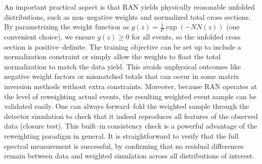         An important practical aspect is that RAN yields physically reasonable unfolded distributions, such as non--negative weights and normalized total cross sections.
        By parametrizing the weight function as $g({z}) = \frac1P\exp(-NN({z}))$ (one convenient choice), we ensure $g({z})\ge 0$ for all events, so the unfolded cross section is positive--definite.
        The training objective can be set up to include a normalization constraint or simply allow the weights to float the total normalization to match the data yield.
        This avoids unphysical outcomes like negative weight factors or mismatched totals that can occur in some matrix inversion methods without extra constraints.
        Moreover, because RAN operates at the level of reweighting actual events, the resulting weighted event sample can be validated easily.
        One can always forward--fold the weighted sample through the detector simulation to check that it indeed reproduces all features of the observed data (closure test).
        This built--in consistency check is a powerful advantage of the reweighting paradigm in general.
        It is straightforward to verify that the full spectral measurement is successful, by confirming that no residual differences remain between data and weighted simulation across all distributions of interest.

